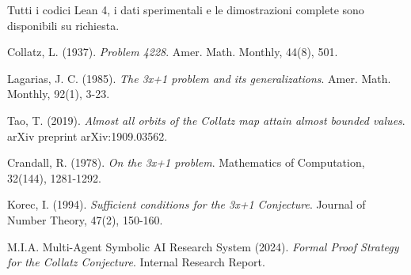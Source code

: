 \documentclass[11pt,a4paper]{article}
\begin{document}
Tutti i codici Lean 4, i dati sperimentali e le dimostrazioni complete sono disponibili su richiesta.


\begin{thebibliography}{99}

Collatz, L. (1937).
\textit{Problem 4228}.
Amer. Math. Monthly, 44(8), 501.

Lagarias, J. C. (1985).
\textit{The 3x+1 problem and its generalizations}.
Amer. Math. Monthly, 92(1), 3-23.

Tao, T. (2019).
\textit{Almost all orbits of the Collatz map attain almost bounded values}.
arXiv preprint arXiv:1909.03562.

Crandall, R. (1978).
\textit{On the 3x+1 problem}.
Mathematics of Computation, 32(144), 1281-1292.

Korec, I. (1994).
\textit{Sufficient conditions for the 3x+1 Conjecture}.
Journal of Number Theory, 47(2), 150-160.

M.I.A. Multi-Agent Symbolic AI Research System (2024).
\textit{Formal Proof Strategy for the Collatz Conjecture}.
Internal Research Report.

\end{thebibliography}
\end{document}
